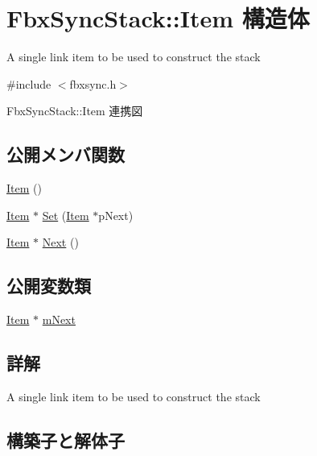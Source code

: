 \hypertarget{struct_fbx_sync_stack_1_1_item}{}\section{Fbx\+Sync\+Stack\+:\+:Item 構造体}
\label{struct_fbx_sync_stack_1_1_item}


A single link item to be used to construct the stack  




{\ttfamily \#include $<$fbxsync.\+h$>$}



Fbx\+Sync\+Stack\+:\+:Item 連携図
\subsection*{公開メンバ関数}
\begin{DoxyCompactItemize}
\item 
\hyperlink{struct_fbx_sync_stack_1_1_item_a08442537e4eebbefc109a934ff308d7e}{Item} ()
\item 
\hyperlink{struct_fbx_sync_stack_1_1_item}{Item} $\ast$ \hyperlink{struct_fbx_sync_stack_1_1_item_a0f671eabe5aa22be73b340d313450423}{Set} (\hyperlink{struct_fbx_sync_stack_1_1_item}{Item} $\ast$p\+Next)
\item 
\hyperlink{struct_fbx_sync_stack_1_1_item}{Item} $\ast$ \hyperlink{struct_fbx_sync_stack_1_1_item_ac9530826bd267a41c9159e229c535140}{Next} ()
\end{DoxyCompactItemize}
\subsection*{公開変数類}
\begin{DoxyCompactItemize}
\item 
\hyperlink{struct_fbx_sync_stack_1_1_item}{Item} $\ast$ \hyperlink{struct_fbx_sync_stack_1_1_item_a8534ccca4fccd6b9ba2a689985e35430}{m\+Next}
\end{DoxyCompactItemize}


\subsection{詳解}
A single link item to be used to construct the stack 

\subsection{構築子と解体子}
\mbox{\label{struct_fbx_sync_stack_1_1_item_a08442537e4eebbefc109a934ff308d7e}} 
